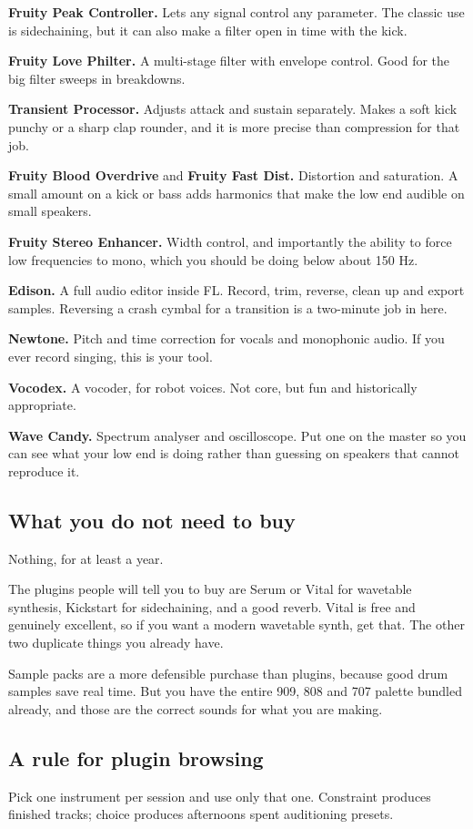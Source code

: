 \textbf{Fruity Peak Controller.} Lets any signal control any parameter. The classic use is
sidechaining, but it can also make a filter open in time with the kick.

\textbf{Fruity Love Philter.} A multi-stage filter with envelope control. Good for the big filter
sweeps in breakdowns.

\textbf{Transient Processor.} Adjusts attack and sustain separately. Makes a soft kick punchy or
a sharp clap rounder, and it is more precise than compression for that job.

\textbf{Fruity Blood Overdrive} and \textbf{Fruity Fast Dist.} Distortion and saturation. A small
amount on a kick or bass adds harmonics that make the low end audible on small speakers.

\textbf{Fruity Stereo Enhancer.} Width control, and importantly the ability to force low
frequencies to mono, which you should be doing below about 150 Hz.

\textbf{Edison.} A full audio editor inside FL. Record, trim, reverse, clean up and export
samples. Reversing a crash cymbal for a transition is a two-minute job in here.

\textbf{Newtone.} Pitch and time correction for vocals and monophonic audio. If you ever record
singing, this is your tool.

\textbf{Vocodex.} A vocoder, for robot voices. Not core, but fun and historically appropriate.

\textbf{Wave Candy.} Spectrum analyser and oscilloscope. Put one on the master so you can see
what your low end is doing rather than guessing on speakers that cannot reproduce it.

\subsection{What you do not need to buy}\label{fl05_plugins-what-you-do-not-need-to-buy}

Nothing, for at least a year.

The plugins people will tell you to buy are Serum or Vital for wavetable synthesis, Kickstart
for sidechaining, and a good reverb. Vital is free and genuinely excellent, so if you want a
modern wavetable synth, get that. The other two duplicate things you already have.

Sample packs are a more defensible purchase than plugins, because good drum samples save
real time. But you have the entire 909, 808 and 707 palette bundled already, and those are
the correct sounds for what you are making.

\subsection{A rule for plugin browsing}\label{fl05_plugins-a-rule-for-plugin-browsing}

Pick one instrument per session and use only that one. Constraint produces finished tracks;
choice produces afternoons spent auditioning presets.
